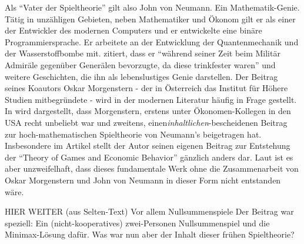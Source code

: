 Als "`Vater der Spieltheorie"' gilt also John von Neumann. Ein Mathematik-Genie. Tätig in unzähligen Gebieten, neben Mathematiker und Ökonom gilt er als einer der Entwickler des modernen Computers und er entwickelte eine binäre Programmiersprache. Er arbeitete an der Entwicklung der Quantenmechanik und der Wasserstoffbombe mit. \textcite[S. 232]{Bernstein1996} zitiert, dass er "`während seiner Zeit beim Militär Admiräle gegenüber Generälen bevorzugte, da diese trinkfester waren"' und weitere Geschichten, die ihn als lebenslustiges Genie darstellen. Der Beitrag seines Koautors Oskar Morgenstern - der in Österreich das Institut für Höhere Studien mitbegründete - wird in der modernen Literatur häufig in Frage gestellt. In \textcite[S. 494]{Leonard1994} wird dargestellt, dass Morgenstern, erstens unter Ökonomen-Kollegen in den USA recht unbeliebt war und zweitens, einen\textit{inhaltlichen}-bescheidenen Beitrag zur hoch-mathematischen Spieltheorie von Neumann's beigetragen hat. Insbesondere im Artikel \textcite{Morgenstern1976} stellt der Autor seinen eigenen Beitrag zur Entstehung der "`Theory of Games and Economic Behavior"' gänzlich anders dar. Laut \textcite{Nash1994} ist es aber unzweifelhaft, dass dieses fundamentale Werk ohne die Zusammenarbeit von Oskar Morgenstern und John von Neumann in dieser Form nicht entstanden wäre.

HIER WEITER (aus Selten-Text) Vor allem Nullsummenspiele
Der Beitrag war speziell: Ein (nicht-kooperatives) zwei-Personen Nullsummenspiel und die Minimax-Lösung dafür.
Was war nun aber der Inhalt dieser frühen Spieltheorie?




